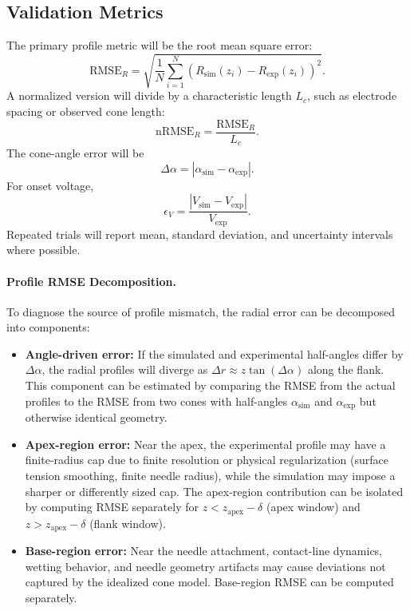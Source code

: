 \subsection{Validation Metrics}

The primary profile metric will be the root mean square error:
\begin{equation}
\mathrm{RMSE}_{R}=\sqrt{\frac{1}{N}\sum_{i=1}^{N}\left(R_{\mathrm{sim}}(z_i)-R_{\mathrm{exp}}(z_i)\right)^2}.
\end{equation}
A normalized version will divide by a characteristic length $L_c$, such as electrode spacing or observed cone length:
\begin{equation}
\mathrm{nRMSE}_{R}=\frac{\mathrm{RMSE}_{R}}{L_c}.
\end{equation}
The cone-angle error will be
\begin{equation}
\Delta\alpha=|\alpha_{\mathrm{sim}}-\alpha_{\mathrm{exp}}|.
\end{equation}
For onset voltage,
\begin{equation}
\epsilon_V=\frac{|V_{\mathrm{sim}}-V_{\mathrm{exp}}|}{V_{\mathrm{exp}}}.
\end{equation}
Repeated trials will report mean, standard deviation, and uncertainty intervals where possible.

\paragraph{Profile RMSE Decomposition.} To diagnose the source of profile mismatch, the radial error can be decomposed into components:
\begin{itemize}
    \item \textbf{Angle-driven error:} If the simulated and experimental half-angles differ by $\Delta\alpha$, the radial profiles will diverge as $\Delta r \approx z \tan(\Delta\alpha)$ along the flank. This component can be estimated by comparing the RMSE from the actual profiles to the RMSE from two cones with half-angles $\alpha_{\mathrm{sim}}$ and $\alpha_{\mathrm{exp}}$ but otherwise identical geometry.
    \item \textbf{Apex-region error:} Near the apex, the experimental profile may have a finite-radius cap due to finite resolution or physical regularization (surface tension smoothing, finite needle radius), while the simulation may impose a sharper or differently sized cap. The apex-region contribution can be isolated by computing RMSE separately for $z < z_{\text{apex}} - \delta$ (apex window) and $z > z_{\text{apex}} - \delta$ (flank window).
    \item \textbf{Base-region error:} Near the needle attachment, contact-line dynamics, wetting behavior, and needle geometry artifacts may cause deviations not captured by the idealized cone model. Base-region RMSE can be computed separately.
\end{itemize}

